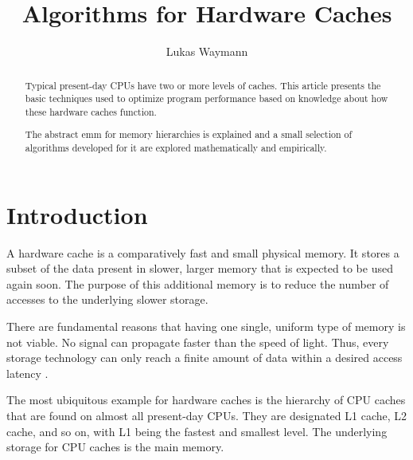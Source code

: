 \documentclass[a4paper]{scrartcl}
\title{Algorithms for Hardware Caches}
\author{Lukas Waymann}
\newcommand{\article}{article} %
\begin{document}
\maketitle
\newpage

\begin{abstract}
   Typical present-day CPUs have two or more levels of caches.  This \article{} presents
   the basic techniques used to optimize program performance based on knowledge about how
   these hardware caches function.

   The abstract \gls{emm} for memory hierarchies is explained and a small selection of
   algorithms developed for it
   are explored mathematically and empirically.
\end{abstract}
\newpage

\tableofcontents
\newpage

\glsresetall %

\section{Introduction}

A hardware cache is a comparatively
fast and small physical memory.  It stores a subset of the data present in slower, larger
memory that is expected to be used again soon.  The purpose of this additional memory is
to reduce the number of accesses to the underlying slower storage.

There are fundamental reasons that having one single, uniform
type of memory is not viable.  No signal can propagate faster than the speed of light.
Thus, every storage technology can only reach a finite amount of data within a desired
access latency \cite[p.~2]{afmh}.


The most ubiquitous example for hardware caches is the hierarchy of
CPU caches that are found on almost all present-day CPUs.  They are designated L1 cache,
L2 cache, and so on, with L1 being the fastest and smallest level.  The underlying storage
for CPU caches is the main memory.
\end{document}
